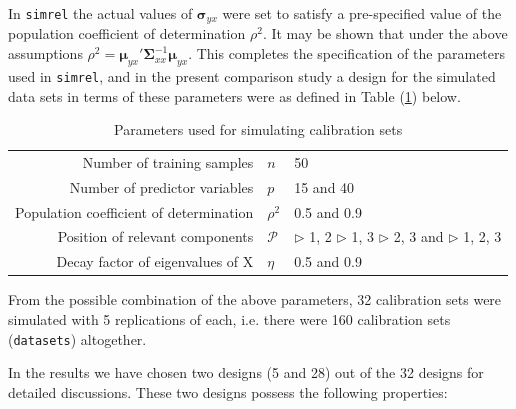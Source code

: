 \documentclass[a4paper, 11pt]{article}
\begin{document}
In {\tt simrel} the actual values of $\boldsymbol{\sigma}_{yx}$ were set to satisfy a pre-specified value of the population coefficient of determination $\rho^2$. It may be shown that under the above assumptions $\rho^2=\boldsymbol{\mu}_{yx}'\boldsymbol{\Sigma}_{xx}^{-1}\boldsymbol{\mu}_{yx}$. This completes the specification of the parameters used in {\tt simrel}, and in the present comparison study a design for the simulated data sets in terms of these parameters were as defined in Table (\ref{tab:parameters}) below.

\bigskip

\begin{table}[ht]
  \centering
  \begin{tabular}{rll}
    Number of training samples              & $n$      & 50                \\
    Number of predictor variables           & $p$      & 15 and 40         \\
    Population coefficient of determination & $\rho^2$ & 0.5 and 0.9       \\
    Position of relevant components         & $\mathcal{P}$
                                            & $\triangleright$ 1, 2 \;
                                                 $\triangleright$ 1,  3 \; \newline
                                                 $\triangleright$ 2,  3 and \;
                                                 $\triangleright$ 1,  2, 3 \\
    Decay factor of eigenvalues of X        & $\eta$   & 0.5 and 0.9
  \end{tabular}
  \caption{Parameters used for simulating calibration sets}
  \label{tab:parameters}
\end{table}

\bigskip

From the possible combination of the above parameters, 32 calibration sets were simulated with 5 replications of each, i.e. there were 160 calibration sets ({\tt datasets}) altogether.
 
In the results we have chosen two designs (5 and 28) out of the 32 designs for detailed discussions. These two designs possess the following properties:
\end{document}
